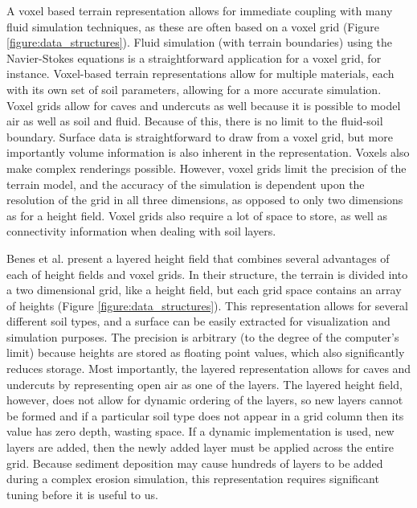 A voxel based terrain representation allows for immediate coupling with many fluid simulation techniques, as these are often based on a voxel grid (Figure \ref{figure:data_structures}). Fluid simulation (with terrain boundaries) using the Navier-Stokes equations is a straightforward application for a voxel grid, for instance. Voxel-based terrain representations allow for multiple materials, each with its own set of soil parameters, allowing for a more accurate simulation. Voxel grids allow for caves and undercuts as well because it is possible to model air as well as soil and fluid. Because of this, there is no limit to the fluid-soil boundary. Surface data is straightforward to draw from a voxel grid, but more importantly volume information is also inherent in the representation. Voxels also make complex renderings possible. However, voxel grids limit the precision of the terrain model, and the accuracy of the simulation is dependent upon the resolution of the grid in all three dimensions, as opposed to only two dimensions as for a height field. Voxel grids also require a lot of space to store, as well as connectivity information when dealing with soil layers.

Benes et al. \cite{Benes-LayeredDataRep} present a layered height field that combines several advantages of each of height fields and voxel grids. In their structure, the terrain is divided into a two dimensional grid, like a height field, but each grid space contains an array of heights (Figure \ref{figure:data_structures}). This representation allows for several different soil types, and a surface can be easily extracted for visualization and simulation purposes. The precision is arbitrary (to the degree of the computer's limit) because heights are stored as floating point values, which also significantly reduces storage. Most importantly, the layered representation allows for caves and undercuts by representing open air as one of the layers. The layered height field, however, does not allow for dynamic ordering of the layers, so new layers cannot be formed and if a particular soil type does not appear in a grid column then its value has zero depth, wasting space. If a dynamic implementation is used, new layers are added, then the newly added layer must be applied across the entire grid. Because sediment deposition may cause hundreds of layers to be added during a complex erosion simulation, this representation requires significant tuning before it is useful to us.

